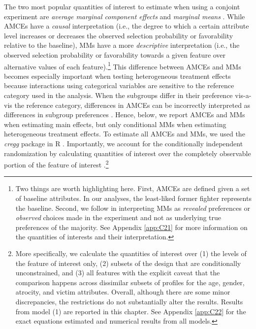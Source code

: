 The two most popular quantities of interest to estimate when using a conjoint experiment are \textit{average marginal component effects} \citep[AMCEs;][]{Hainmueller2014a} and \textit{marginal means} \citep[MMs][]{Leeper2019}. While AMCEs have a \textit{causal }interpretation (i.e., the degree to which a certain attribute level increases or decreases the observed selection probability or favorability relative to the baseline), MMs have a more \textit{descriptive }interpretation (i.e., the observed selection probability or favorability towards a given feature over alternative values of each feature).\footnote{Two things are worth highlighting here. First, AMCEs are defined given a set of baseline attributes. In our analyses, the least-liked former fighter represents the baseline. Second, we follow \cite{Abramson2019} in interpreting MMs as \textit{revealed} preferences or \textit{observed} choices made in the experiment and not as underlying true preferences of the majority. See Appendix \ref{app:C21} for more information on the quantities of interests and their interpretation.} This difference between AMCEs and MMs becomes especially important when testing heterogeneous treatment effects because interactions using categorical variables are sensitive to the reference category used in the analysis. When the subgroups differ in their preference vis-a-vis the reference category, differences in AMCEs can be incorrectly interpreted as differences in subgroup preferences \citep{Leeper2019}. Hence, below, we report AMCEs and MMs when estimating main effects, but only conditional MMs when estimating heterogeneous treatment effects. To estimate all AMCEs and MMs, we used the \textit{cregg} package in R \citep{Leeper2018a}. Importantly, we account for the conditionally independent randomization by calculating quantities of interest over the completely observable portion of the feature of interest \citep{Leeper2019}.\footnote{ More specifically, we calculate the quantities of interest over (1) the levels of the feature of interest only, (2) subsets of the design that are conditionally unconstrained, and (3) all features with the explicit caveat that the comparison happens across dissimilar subsets of profiles for the age, gender, atrocity, and victim attributes. Overall, although there are some minor discrepancies, the restrictions do not substantially alter the results. Results from model (1) are reported in this chapter. See Appendix \ref{app:C22} for the exact equations estimated and numerical results from all models.}


